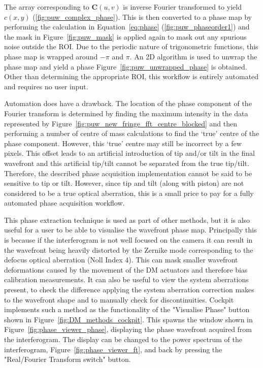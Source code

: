 The array corresponding to $\boldsymbol{C}(u,v)$ is inverse Fourier transformed to yield $c(x,y)$ (\ref{fig:puw_complex_phase}). This is then converted to a phase map by performing the calculation in Equation~\ref{eq:phase} (\ref{fig:puw_phaseorder1}) and the mask in Figure~\ref{fig:puw_mask} is applied again to mask out any spurious noise outside the ROI. Due to the periodic nature of trigonometric functions, this phase map is wrapped around $-\pi$ and $\pi$. An 2D  algorithm is used to unwrap the phase map and yield a phase Figure~\ref{fig:puw_unwrapped_phase} is obtained\cite{herraez2002fast}. Other than determining the appropriate ROI, this workflow is entirely automated and requires no user input. 

Automation does have a drawback. The location of the phase component of the Fourier transform is determined by finding the maximum intensity in the data represented by Figure~\ref{fig:puw_new_fringe_fft_centre_blocked} and then performing a number of centre of mass calculations to find the `true' centre of the phase component. However, this `true' centre may still be incorrect by a few pixels. This offset leads to an artificial introduction of tip and/or tilt in the final wavefront and this artificial tip/tilt cannot be separated from the true tip/tilt. Therefore, the described phase acquisition implementation cannot be said to be sensitive to tip or tilt. However, since tip and tilt (along with piston) are not considered to be a true optical aberration, this is a small price to pay for a fully automated phase acquisition workflow.

This phase extraction technique is used as part of other methods, but it is also useful for a user to be able to visualise the wavefront phase map. Principally this is because if the interferogram is not well focused on the camera it can result in the wavefront being heavily distorted by the Zernike mode corresponding to the defocus optical aberration (Noll Index 4). This can mask smaller wavefront deformations caused by the movement of the DM actuators and therefore bias calibration measurements. It can also be useful to view the system aberrations present, to check the difference applying the system aberration correction makes to the wavefront shape and to manually check for discontinuities. Cockpit implements such a method as the functionality of the "Visualise Phase" button shown in Figure~\ref{fig:DM_methods_cockpit}. This spawns the window shown in Figure~\ref{fig:phase_viewer_phase}, displaying the phase wavefront acquired from the interferogram. The display can be changed to the power spectrum of the interferogram, Figure~\ref{fig:phase_viewer_ft}, and back by pressing the "Real/Fourier Transform switch" button. 

